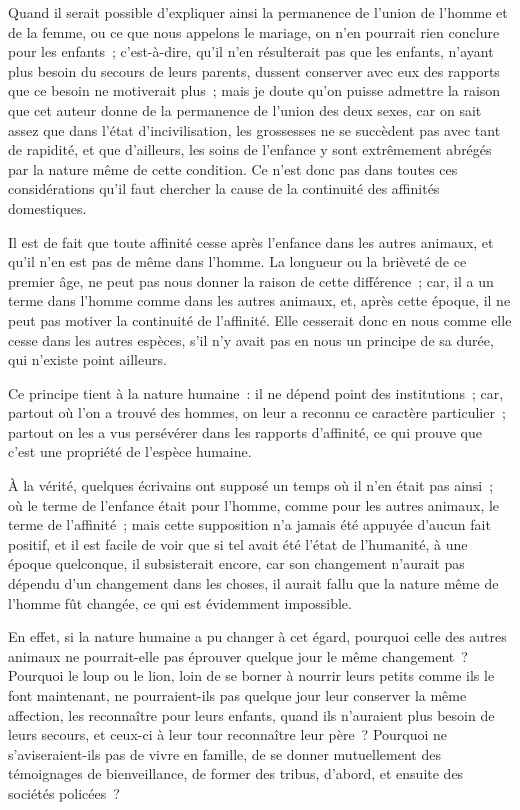 \documentclass[french,twoside]{book} %
\begin{document}
Quand il serait possible d’expliquer ainsi la permanence de l’union de l’homme et de la femme, ou ce que nous appelons le mariage, on n’en pourrait rien conclure pour les enfants ; c’est-à-dire, qu’il n’en résulterait pas que les enfants, n’ayant plus besoin du secours de leurs parents, dussent conserver avec eux des rapports que ce besoin ne motiverait plus ; mais je doute qu’on puisse admettre la raison que cet auteur donne de la permanence de l’union des deux sexes, car on sait assez que dans l’état d’incivilisation, les grossesses ne se succèdent pas avec tant de rapidité, et que d’ailleurs, les soins de l’enfance y sont extrêmement abrégés par la nature même de cette condition. Ce n’est donc pas dans toutes ces considérations qu’il faut chercher la cause de la continuité des affinités domestiques.\par
Il est de fait que toute affinité cesse après l’enfance dans les autres animaux, et qu’il n’en est pas de même dans l’homme. La longueur ou la brièveté de ce premier âge, ne peut pas nous donner la raison de cette différence ; car, il a un terme dans l’homme comme dans les autres animaux, et, après cette époque, il ne peut pas motiver la continuité de l’affinité. Elle cesserait donc en nous comme elle cesse dans les autres espèces, s’il n’y avait pas en nous un principe de sa durée, qui n’existe point ailleurs.\par
Ce principe tient à la nature humaine : il ne dépend point des institutions ; car, partout où l’on a trouvé des hommes, on leur a reconnu ce caractère particulier ; partout on les a vus persévérer dans les rapports d’affinité, ce qui prouve que c’est une propriété de l’espèce humaine.\par
À la vérité, quelques écrivains ont supposé un temps où il n’en était pas ainsi ; où le terme de l’enfance était pour l’homme, comme pour les autres animaux, le terme de l’affinité ; mais cette supposition n’a jamais été appuyée d’aucun fait positif, et il est facile de voir que si tel avait été l’état de l’humanité, à une époque quelconque, il subsisterait encore, car son changement n’aurait pas dépendu d’un changement dans les choses, il aurait fallu que la nature même de l’homme fût changée, ce qui est évidemment impossible.\par
En effet, si la nature humaine a pu changer à cet égard, pourquoi celle des autres animaux ne pourrait-elle pas éprouver quelque jour le même changement ? Pourquoi le loup ou le lion, loin de se borner à nourrir leurs petits comme ils le font maintenant, ne pourraient-ils pas quelque jour leur conserver la même affection, les reconnaître pour leurs enfants, quand ils n’auraient plus besoin de leurs secours, et ceux-ci à leur tour reconnaître leur père ? Pourquoi ne s’aviseraient-ils pas de vivre en famille, de se donner mutuellement des témoignages de bienveillance, de former des tribus, d’abord, et ensuite des sociétés policées ?\par
\end{document}
